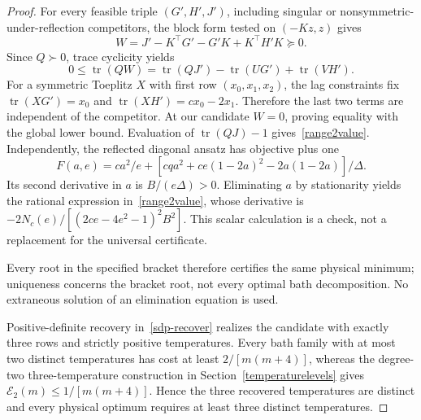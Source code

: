 \documentclass[11pt]{article}
\begin{document}
\begin{proof}
For every feasible triple $(G',H',J')$, including singular or nonsymmetric-under-reflection competitors, the block form tested on $(-Kz,z)$ gives
\[
W=J'-K^\top G'-G'K+K^\top H'K\succeq0.
\]
Since $Q\succ0$, trace cyclicity yields
\[
0\le\operatorname{tr}(QW)=\operatorname{tr}(QJ')-\operatorname{tr}(UG')+\operatorname{tr}(VH').
\]
For a symmetric Toeplitz $X$ with first row $(x_0,x_1,x_2)$, the lag constraints fix $\operatorname{tr}(XG')=x_0$ and $\operatorname{tr}(XH')=cx_0-2x_1$. Therefore the last two terms are independent of the competitor. At our candidate $W=0$, proving equality with the global lower bound. Evaluation of $\operatorname{tr}(QJ)-1$ gives~\eqref{range2value}. Independently, the reflected diagonal ansatz has objective plus one
\[
F(a,e)=ca^2/e+[cqa^2+ce(1-2a)^2-2a(1-2a)]/\Delta.
\]
Its second derivative in $a$ is $B/(e\Delta)>0$. Eliminating $a$ by stationarity yields the rational expression in~\eqref{range2value}, whose derivative is $-2N_c(e)/[(2ce-4e^2-1)^2B^2]$. This scalar calculation is a check, not a replacement for the universal certificate.

Every root in the specified bracket therefore certifies the same physical minimum; uniqueness concerns the bracket root, not every optimal bath decomposition. No extraneous solution of an elimination equation is used.

Positive-definite recovery in~\eqref{sdp-recover} realizes the candidate with exactly three rows and strictly positive temperatures. Every bath family with at most two distinct temperatures has cost at least $2/[m(m+4)]$, whereas the degree-two three-temperature construction in Section~\ref{temperaturelevels} gives $\mathcal E_2(m)\le1/[m(m+4)]$. Hence the three recovered temperatures are distinct and every physical optimum requires at least three distinct temperatures.
\end{proof}
\end{document}
